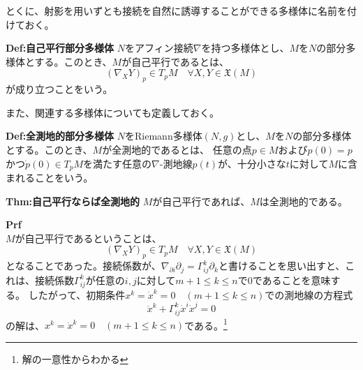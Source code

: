 \documentclass[a4paper,11pt]{jsarticle}
\numberwithin{equation}{section}
\begin{document}
とくに、射影を用いずとも接続を自然に誘導することができる多様体に名前を付けておく。
\begin{itembox}[l]{\textbf{Def:自己平行部分多様体}}
    $N$をアフィン接続$\nabla$を持つ多様体とし、$M$を$N$の部分多様体とする。このとき、$M$が自己平行であるとは、
    \begin{equation}
        (\nabla_X Y)_p \in T_pM \quad \forall X,Y \in \mathfrak{X}(M)
    \end{equation}
    が成り立つことをいう。

\end{itembox}
また、関連する多様体についても定義しておく。

\begin{itembox}[l]{\textbf{Def:全測地的部分多様体}}
    $N$をRiemann多様体$(N,g)$とし、$M$を$N$の部分多様体とする。このとき、$M$が全測地的であるとは、
    任意の点$p \in M$および$p(0) =p$かつ$\dot{p}(0) \in T_pM$を満たす任意の$\nabla$-測地線$p(t)$が、十分小さな$t$に対して$M$に含まれることをいう。
\end{itembox}

\begin{itembox}[l]{\textbf{Thm:自己平行ならば全測地的}}
    $M$が自己平行であれば、$M$は全測地的である。
\end{itembox}
\textbf{Prf}\\
$M$が自己平行であるということは、
\begin{equation}
    (\nabla_X Y)_p \in T_pM \quad \forall X,Y \in \mathfrak{X}(M)
\end{equation}
となることであった。接続係数が、$\nabla_{\partial{i}}\partial_{j} = \Gamma_{ij}^k\partial_{k}$と書けることを思い出すと、これは、接続係数$\Gamma_{ij}^k$が任意の$i,j$に対して$m+1 \leq k \leq n$で$0$であることを意味する。
したがって、初期条件$x^k =\dot{x}^k = 0 \quad (m+1 \leq k \leq n)$での測地線の方程式
\begin{equation}
    \ddot{x}^k + \Gamma_{ij}^k \dot{x}^i \dot{x}^j = 0
\end{equation}
の解は、$x^k = \dot{x}^k = 0 \quad (m+1 \leq k \leq n)$である。\footnote{解の一意性からわかる}\hfill\qedsymbol
\end{document}
